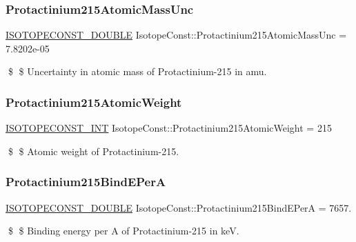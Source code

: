 \subsubsection{\texorpdfstring{Protactinium215\+Atomic\+Mass\+Unc}{Protactinium215AtomicMassUnc}}
{\footnotesize\ttfamily \mbox{\hyperlink{group___isotope_const-_macros_ga8f45a7272ce02c0b4c65c44636ed719a}{I\+S\+O\+T\+O\+P\+E\+C\+O\+N\+S\+T\+\_\+\+D\+O\+U\+B\+LE}} Isotope\+Const\+::\+Protactinium215\+Atomic\+Mass\+Unc = 7.\+8202e-\/05}

\$ \$ Uncertainty in atomic mass of Protactinium-\/215 in amu. \mbox{\label{group___isotope_const-_protactinium-_pa215_ga0495afdea4b1ef2355c9db5149e1e238}} 
\subsubsection{\texorpdfstring{Protactinium215\+Atomic\+Weight}{Protactinium215AtomicWeight}}
{\footnotesize\ttfamily \mbox{\hyperlink{group___isotope_const-_macros_ga5f18360b3e99483a35c32d789e62621c}{I\+S\+O\+T\+O\+P\+E\+C\+O\+N\+S\+T\+\_\+\+I\+NT}} Isotope\+Const\+::\+Protactinium215\+Atomic\+Weight = 215}

\$ \$ Atomic weight of Protactinium-\/215. \mbox{\label{group___isotope_const-_protactinium-_pa215_gadc7a98071e820595c5b38319fa8db065}} 
\subsubsection{\texorpdfstring{Protactinium215\+Bind\+E\+PerA}{Protactinium215BindEPerA}}
{\footnotesize\ttfamily \mbox{\hyperlink{group___isotope_const-_macros_ga8f45a7272ce02c0b4c65c44636ed719a}{I\+S\+O\+T\+O\+P\+E\+C\+O\+N\+S\+T\+\_\+\+D\+O\+U\+B\+LE}} Isotope\+Const\+::\+Protactinium215\+Bind\+E\+PerA = 7657.}

\$ \$ Binding energy per A of Protactinium-\/215 in keV. \mbox{\label{group___isotope_const-_protactinium-_pa215_ga4cdfee29082826488ecf206cb54d7c6e}} 
